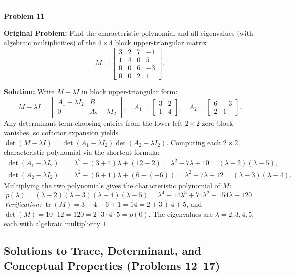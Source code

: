 \documentclass[11pt, letterpaper]{article}
\theoremstyle{definition}
\theoremstyle{remark}
\begin{document}
\noindent\rule{\textwidth}{0.4pt}

\noindent\textbf{Problem 11}

\textbf{Original Problem:} Find the characteristic polynomial and all eigenvalues (with algebraic multiplicities) of the $4 \times 4$ block upper-triangular matrix
\[
M = \begin{bmatrix}
3 & 2 & 7 & -1 \\
1 & 4 & 0 & 5 \\
0 & 0 & 6 & -3 \\
0 & 0 & 2 & 1
\end{bmatrix}.
\]

\textbf{Solution:} Write $M - \lambda I$ in block upper-triangular form:
\[
M - \lambda I = \begin{bmatrix} A_1 - \lambda I_2 & B \\ 0 & A_2 - \lambda I_2 \end{bmatrix}, \quad A_1 = \begin{bmatrix} 3 & 2 \\ 1 & 4 \end{bmatrix}, \quad A_2 = \begin{bmatrix} 6 & -3 \\ 2 & 1 \end{bmatrix}.
\]
Any determinant term choosing entries from the lower-left $2 \times 2$ zero block vanishes, so cofactor expansion yields $\det(M - \lambda I) = \det(A_1 - \lambda I_2)\det(A_2 - \lambda I_2)$. Computing each $2 \times 2$ characteristic polynomial via the shortcut formula:
\begin{align*}
\det(A_1 - \lambda I_2) &= \lambda^2 - (3 + 4)\lambda + (12 - 2) = \lambda^2 - 7\lambda + 10 = (\lambda - 2)(\lambda - 5), \\
\det(A_2 - \lambda I_2) &= \lambda^2 - (6 + 1)\lambda + (6 - (-6)) = \lambda^2 - 7\lambda + 12 = (\lambda - 3)(\lambda - 4).
\end{align*}
Multiplying the two polynomials gives the characteristic polynomial of $M$:
\[
p(\lambda) = (\lambda - 2)(\lambda - 3)(\lambda - 4)(\lambda - 5) = \lambda^4 - 14\lambda^3 + 71\lambda^2 - 154\lambda + 120.
\]
\textit{Verification:} $\operatorname{tr}(M) = 3 + 4 + 6 + 1 = 14 = 2 + 3 + 4 + 5$, and $\det(M) = 10 \cdot 12 = 120 = 2 \cdot 3 \cdot 4 \cdot 5 = p(0)$.
The eigenvalues are $\lambda = 2, 3, 4, 5$, each with algebraic multiplicity $1$.

\subsection{Solutions to Trace, Determinant, and Conceptual Properties (Problems 12--17)}
\end{document}

